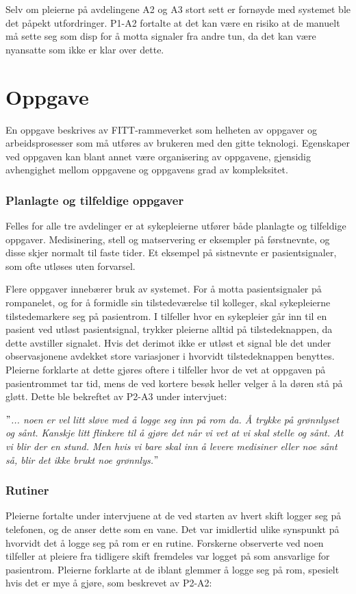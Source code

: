 \noindent
Selv om pleierne på avdelingene A2 og A3 stort sett er fornøyde med systemet ble det påpekt utfordringer. P1-A2 fortalte at det kan være en risiko at de manuelt må sette seg som disp for å motta signaler fra andre tun, da det kan være nyansatte som ikke er klar over dette.  

\section{Oppgave}
En oppgave beskrives av FITT-rammeverket som helheten av oppgaver og arbeidsprosesser som må utføres av brukeren med den gitte teknologi. Egenskaper ved oppgaven kan blant annet være organisering av oppgavene, gjensidig avhengighet mellom oppgavene og oppgavens grad av kompleksitet.

\subsubsection{Planlagte og tilfeldige oppgaver}
Felles for alle tre avdelinger er at sykepleierne utfører både planlagte og tilfeldige oppgaver. Medisinering, stell og matservering er eksempler på førstnevnte, og disse skjer normalt til faste tider. Et eksempel på sistnevnte er pasientsignaler, som ofte utløses uten forvarsel.  

\noindent
Flere oppgaver innebærer bruk av systemet. For å motta pasientsignaler på rompanelet, og for å formidle sin tilstedeværelse til kolleger, skal sykepleierne tilstedemarkere seg på pasientrom. I tilfeller hvor en sykepleier går inn til en pasient ved utløst pasientsignal, trykker pleierne alltid på tilstedeknappen, da dette avstiller signalet. Hvis det derimot ikke er utløst et signal ble det under observasjonene avdekket store variasjoner i hvorvidt tilstedeknappen benyttes. Pleierne forklarte at dette gjøres oftere i tilfeller hvor de vet at oppgaven på pasientrommet tar tid, mens de ved kortere besøk heller velger å la døren stå på gløtt. Dette ble bekreftet av P2-A3 under intervjuet: 

\noindent
\textit{$"$... noen er vel litt sløve med å logge seg inn på rom da. Å trykke på grønnlyset og sånt. Kanskje litt flinkere til å gjøre det når vi vet at vi skal stelle og sånt. At vi blir der en stund. Men hvis vi bare skal inn å levere medisiner eller noe sånt så, blir det ikke brukt noe grønnlys.$"$}

\subsubsection{Rutiner}
Pleierne fortalte under intervjuene at de ved starten av hvert skift logger seg på telefonen, og de anser dette som en vane. Det var imidlertid ulike synspunkt på hvorvidt det å logge seg på rom er en rutine. Forskerne observerte ved noen tilfeller at pleiere fra tidligere skift fremdeles var logget på som ansvarlige for pasientrom. Pleierne forklarte at de iblant glemmer å logge seg på rom, spesielt hvis det er mye å gjøre, som beskrevet av P2-A2:

